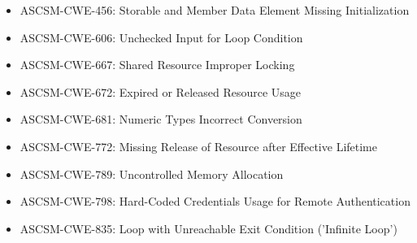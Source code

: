 \documentclass[openany,10pt,a4paper]{article}
\begin{document}
\begin{appendix}
\begin{itemize}
	\item ASCSM-CWE-456: Storable and Member Data Element Missing Initialization
	\item ASCSM-CWE-606: Unchecked Input for Loop Condition
	\item ASCSM-CWE-667: Shared Resource Improper Locking
	\item ASCSM-CWE-672: Expired or Released Resource Usage
	\item ASCSM-CWE-681: Numeric Types Incorrect Conversion
	\item ASCSM-CWE-772: Missing Release of Resource after Effective Lifetime
	\item ASCSM-CWE-789: Uncontrolled Memory Allocation
	\item ASCSM-CWE-798: Hard-Coded Credentials Usage for Remote Authentication
	\item ASCSM-CWE-835: Loop with Unreachable Exit Condition ('Infinite Loop')
\end{itemize} 


\end{appendix}
\end{document}
